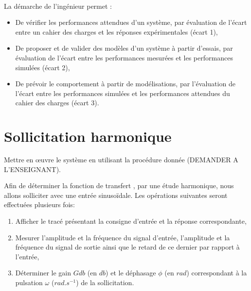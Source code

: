 



 \\

\graphicspath{{../../img/}}
\begin{center}
\def\svgwidth{\columnwidth}

\end{center}

La démarche de l’ingénieur permet :
\begin{itemize}
 \item De vérifier les performances attendues d’un système, par évaluation de l’écart entre un cahier des charges et les réponses expérimentales (écart 1),
 \item De proposer et de valider des modèles d’un système à partir d’essais, par évaluation de l’écart entre les performances mesurées et les performances simulées (écart 2),
 \item De prévoir le comportement à partir de modélisations, par l’évaluation de l’écart entre les performances simulées et les performances attendues du cahier des charges (écart 3).
\end{itemize}



\newpage

\section{Sollicitation harmonique}

Mettre en \oe uvre le système en utilisant la procédure donnée (DEMANDER A L'ENSEIGNANT).

Afin de déterminer la fonction de transfert \dusysteme, par une étude harmonique, nous allons \le solliciter avec une entrée sinusoïdale. Les opérations suivantes seront effectuées plusieurs fois:
\begin{enumerate}
 \item Afficher le tracé présentant la consigne d'entrée et la réponse correspondante,
 \item Mesurer l'amplitude et la fréquence du signal d'entrée, l'amplitude et la fréquence du signal de sortie ainsi que le retard de ce dernier par rapport à l'entrée,
 \item Déterminer le gain $Gdb$ (en $db$) et le déphasage $\phi$ (en $rad$) correspondant à la pulsation $\omega$ ($rad.s^{-1}$) de la sollicitation.
\end{enumerate}

